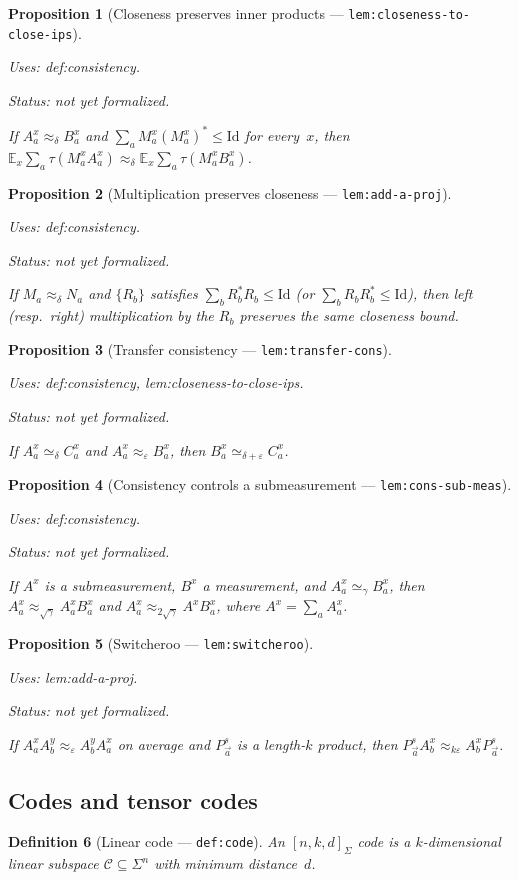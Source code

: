 \documentclass{article}
\providecommand{\uses}[1]{\par\smallskip\noindent\emph{Uses:} #1.\par\smallskip}
\providecommand{\notready}{\par\smallskip\noindent\emph{Status: not yet formalized.}\par\smallskip}
\newtheorem{definition}{Definition}[section]
\newtheorem{proposition}[definition]{Proposition}
\theoremstyle{remark}
\newcommand{\E}{\mathbb{E}}
\newcommand{\id}{\mathrm{Id}}
\newcommand{\code}{\mathcal{C}}
\newcommand{\eps}{\varepsilon}
\begin{document}
\begin{proposition}[Closeness preserves inner products --- \texttt{lem:closeness-to-close-ips}]
	\label{lem:closeness-to-close-ips}
	\uses{def:consistency}
	\notready
	If $A^x_a\approx_\delta B^x_a$ and $\sum_a M^x_a(M^x_a)^*\le\id$ for
	every~$x$, then
	$\E_x\sum_a\tau(M^x_a A^x_a)\approx_\delta\E_x\sum_a\tau(M^x_a B^x_a)$.
\end{proposition}

\begin{proposition}[Multiplication preserves closeness --- \texttt{lem:add-a-proj}]
	\label{lem:add-a-proj}
	\uses{def:consistency}
	\notready
	If $M_a\approx_\delta N_a$ and $\{R_b\}$ satisfies $\sum_b R_b^*R_b\le\id$
	(or $\sum_b R_b R_b^*\le\id$), then left (resp.\ right) multiplication by the
	$R_b$ preserves the same closeness bound.
\end{proposition}

\begin{proposition}[Transfer consistency --- \texttt{lem:transfer-cons}]
	\label{lem:transfer-cons}
	\uses{def:consistency, lem:closeness-to-close-ips}
	\notready
	If $A^x_a\simeq_\delta C^x_a$ and $A^x_a\approx_\eps B^x_a$,
	then $B^x_a\simeq_{\delta+\eps} C^x_a$.
\end{proposition}

\begin{proposition}[Consistency controls a submeasurement --- \texttt{lem:cons-sub-meas}]
	\label{lem:cons-sub-meas}
	\uses{def:consistency}
	\notready
	If $A^x$ is a submeasurement, $B^x$ a measurement, and
	$A^x_a\simeq_\gamma B^x_a$, then
	$A^x_a\approx_{\sqrt\gamma} A^x_a B^x_a$
	and $A^x_a\approx_{2\sqrt\gamma} A^x B^x_a$,
	where $A^x=\sum_a A^x_a$.
\end{proposition}

\begin{proposition}[Switcheroo --- \texttt{lem:switcheroo}]
	\label{lem:switcheroo}
	\uses{lem:add-a-proj}
	\notready
	If $A^x_a A^y_b\approx_\eps A^y_b A^x_a$ on average and $P^s_{\vec a}$ is
	a length-$k$ product, then
	$P^s_{\vec a}A^x_b\approx_{k\eps}A^x_b P^s_{\vec a}$.
\end{proposition}

\subsection{Codes and tensor codes}

\begin{definition}[Linear code --- \texttt{def:code}]\label{def:code}
	An $[n,k,d]_\Sigma$ code is a $k$-dimensional linear subspace
	$\code\subseteq\Sigma^n$ with minimum distance~$d$.
\end{definition}
\end{document}
